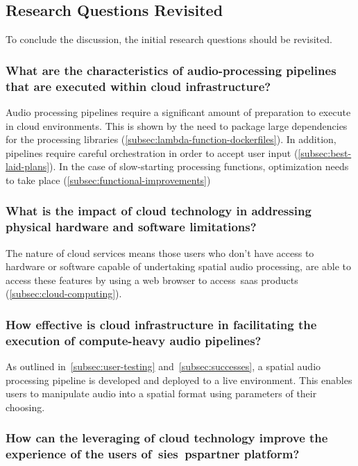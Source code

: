 \subsection{Research Questions Revisited}\label{subsec:research-questions2}

To conclude the discussion, the initial research questions should be revisited.

\subsubsection{What are the characteristics of audio-processing pipelines that are executed within cloud infrastructure?}

Audio processing pipelines require a significant amount of preparation to execute in cloud environments.
This is shown by the need
to package large dependencies for the processing libraries (\ref{subsec:lambda-function-dockerfiles}).
In addition, pipelines require careful orchestration in order to accept user input (\ref{subsec:best-laid-plans}).
In the case of slow-starting processing functions,
optimization needs to take place (\ref{subsec:functional-improvements})

\subsubsection{What is the impact of cloud technology in addressing physical hardware and software limitations?}

The nature of cloud services means those users
who don't have access to hardware or software capable of undertaking spatial audio processing,
are able to access these features by using a web browser to access~\gls{saas} products (\ref{subsec:cloud-computing}).

\subsubsection{How effective is cloud infrastructure in facilitating the execution of compute-heavy audio pipelines?}

As outlined in~\ref{subsec:user-testing} and~\ref{subsec:successes},
a spatial audio processing pipeline is developed and deployed to a live environment.
This enables users to manipulate audio into a spatial format using parameters of their choosing.

\subsubsection{How can the leveraging of cloud technology improve the experience of the users of~\glspl{sie}~\gls{pspartner} platform?}

